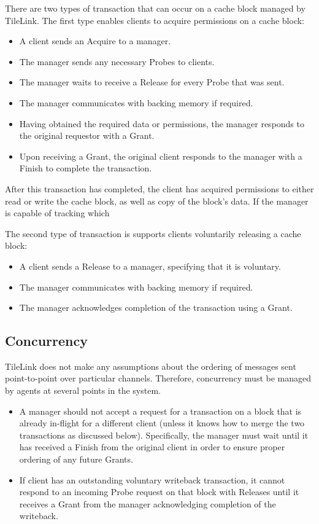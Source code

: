 There are two types of transaction that can occur on a cache block managed by TileLink.
The first type enables clients to acquire permissions on a cache block:
\begin{itemize}
\item A client sends an Acquire to a manager.
\item The manager sends any necessary Probes to clients.
\item The manager waits to receive a Release for every Probe that was sent.
\item The manager communicates with backing memory if required.
\item Having obtained the required data or permissions, the manager responds to the original requestor with a Grant.
\item Upon receiving a Grant, the original client responds to the manager with a Finish to complete the transaction.
\end{itemize}
After this transaction has completed, the client has acquired permissions to either read or write the cache block, as well as copy of the block's data.
If the manager is capable of tracking which

The second type of transaction is supports clients voluntarily releasing a cache block:
\begin{itemize}
\item A client sends a Release to a manager, specifying that it is voluntary.
\item The manager communicates with backing memory if required.
\item The manager acknowledges completion of the transaction using a Grant.
\end{itemize}



\subsection{Concurrency}

TileLink does not make any assumptions about the ordering of messages sent point-to-point over particular channels.
Therefore, concurrency must be managed by agents at several points in the system.
\begin{itemize}
\item A manager should not accept a request for a transaction on a block that is already in-flight for a different client (unless it knows how to merge the two transactions as discussed below). Specifically, the manager must wait until it has received a Finish from the original client in order to ensure proper ordering of any future Grants.
\item If client has an outstanding voluntary writeback transaction, it cannot respond to an incoming Probe request on that block with Releases until it receives a Grant from the manager acknowledging completion of the writeback.
\end{itemize}


